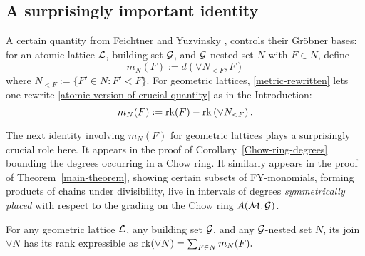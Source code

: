 \subsection{A surprisingly important identity} \label{suprising-identity-section}
A certain quantity from
Feichtner and Yuzvinsky \cite[\S3]{FY},
controls their 
Gr\"obner bases: for 
an atomic lattice $\mathcal{L}$, building set $\mathcal{G}$, and $\mathcal{G}$-nested set $N$ with $F \in N$, define
\begin{equation}
\label{atomic-version-of-crucial-quantity}
m_N(F):=d(\vee N_{<F},F)
\end{equation}
where $N_{<F}:=\{F' \in N: F' < F\}$.
For geometric lattices, \eqref{metric-rewritten} lets one rewrite \eqref{atomic-version-of-crucial-quantity} as in the Introduction:
\begin{equation}
\label{crucial-quantity}
m_N(F):=\operatorname{\mathrm{rk}}(F) - \operatorname{\mathrm{rk}} \left( \vee N_{<F} \right).
\end{equation}

The next identity involving $m_N(F)$ for geometric lattices plays a surprisingly crucial role here.
It appears in the proof of Corollary~\ref{Chow-ring-degrees} bounding the degrees occurring in a Chow ring.
It similarly appears in the proof of Theorem~\ref{main-theorem},
showing certain subsets of FY-monomials, forming products of chains under divisibility, live in intervals of degrees {\it symmetrically placed} with respect to the grading on
the Chow ring $A(\mathcal{M},\mathcal{G})$.

\begin{lemma}\label{lem:crucial-numerical-fact}
For any geometric lattice $\mathcal{L}$, any building set $\mathcal{G}$,
and any $\mathcal{G}$-nested set $N$, its join 
$\vee N$ has its rank expressible as
$
  \operatorname{\mathrm{rk}}(\vee N)= \sum_{F \in N} m_N(F).
$
\end{lemma}

